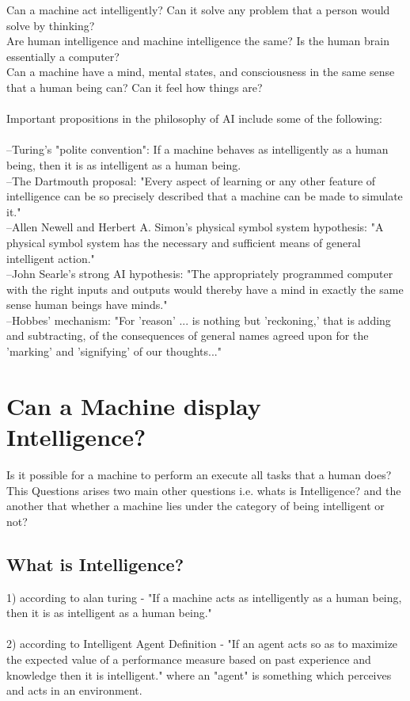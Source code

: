 \documentclass[a4paper]{article}
\begin{document}
Can a machine act intelligently? Can it solve any problem that a person would solve by thinking?\\
Are human intelligence and machine intelligence the same? Is the human brain essentially a computer?\\
Can a machine have a mind, mental states, and consciousness in the same sense that a human being can? Can it feel how things are?\\
\\
Important propositions in the philosophy of AI include some of the following:\\
\\
--Turing's "polite convention": If a machine behaves as intelligently as a human being, then it is as intelligent as a human being.\\
--The Dartmouth proposal: "Every aspect of learning or any other feature of intelligence can be so precisely described that a machine can be made to simulate it."\\
--Allen Newell and Herbert A. Simon's physical symbol system hypothesis: "A physical symbol system has the necessary and sufficient means of general intelligent action."\\
--John Searle's strong AI hypothesis: "The appropriately programmed computer with the right inputs and outputs would thereby have a mind in exactly the same sense human beings have minds."\\
--Hobbes' mechanism: "For 'reason' ... is nothing but 'reckoning,' that is adding and subtracting, of the consequences of general names agreed upon for the 'marking' and 'signifying' of our thoughts..."\\

\section{Can a Machine display Intelligence?}
Is it possible for a machine to perform an execute all tasks that a human does?\\
This Questions arises two main other questions i.e.  whats is Intelligence? and the another that whether a machine lies under the category of being intelligent or not?\\
\subsection{What is Intelligence?}
1) according to alan turing - "If a machine acts as intelligently as a human being, then it is as intelligent as a human being."\\
\\
2) according to Intelligent Agent Definition - "If an agent acts so as to maximize the expected value of a performance measure based on past experience and knowledge then it is intelligent." where an "agent" is something which perceives and acts in an environment.
\bigskip
\end{document}
